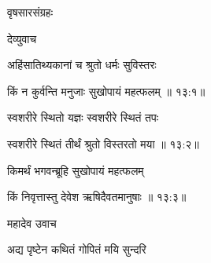 \centerline{\Huge\devanagarifontbold वृषसारसंग्रहः  }

 
{\vrule depth10pt width0pt}

\vers

\thispagestyle{empty}

\centerline{\Large\devanagarifontbold [   त्रयोदशमो ऽध्यायः  ]}{\vrule depth10pt width0pt} 
\fancyhead[LE]{}
\fancyhead[RE]{}
\fancyhead[LO]{}
\fancyhead[RO]{}
\szam\bek



{\devanagarifont देव्युवाच {\dandab}\dontdisplaylinenum  }%
 
{\devanagarifont अहिंसातिथ्यकानां च श्रुतो धर्मः सुविस्तरः \thinspace{\danda} \dontdisplaylinenum }%


{\devanagarifont किं न कुर्वन्ति मनुजाः सुखोपायं महत्फलम् {॥ १३:१॥} \veg\dontdisplaylinenum }%

{\devanagarifont स्वशरीरे स्थितो यज्ञः स्वशरीरे स्थितं तपः \thinspace{\dandab} \dontdisplaylinenum }%


{\devanagarifont स्वशरीरे स्थितं तीर्थं श्रुतो विस्तरतो मया {॥ १३:२॥} \veg\dontdisplaylinenum }%

{\devanagarifont किमर्थं भगवन्ब्रूहि सुखोपायं महत्फलम् \thinspace{\dandab} \dontdisplaylinenum }%


{\devanagarifont किं निवृत्तास्तु देवेश ऋषिदैवतमानुषाः {॥ १३:३॥} \veg\dontdisplaylinenum }%
 
{\devanagarifont महादेव उवाच {\dandab}\dontdisplaylinenum  }%

{\devanagarifont अद्य पृष्टेन कथितं गोपितं मयि सुन्दरि \thinspace{\danda} \dontdisplaylinenum }%

